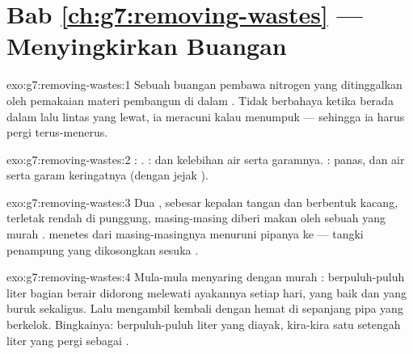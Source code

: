 \section*{Bab \ref{ch:g7:removing-wastes} --- Menyingkirkan Buangan}

\begin{solution}{exo:g7:removing-wastes:1}
Sebuah buangan pembawa nitrogen yang ditinggalkan oleh pemakaian  materi pembangun di dalam . Tidak berbahaya ketika berada
dalam lalu lintas yang lewat, ia meracuni kalau menumpuk --- sehingga
ia harus pergi terus-menerus.
\end{solution}

\begin{solution}{exo:g7:removing-wastes:2}
: . :  dan kelebihan air serta
garamnya. : panas, dan air serta garam keringatnya (dengan jejak
).
\end{solution}

\begin{solution}{exo:g7:removing-wastes:3}
Dua , sebesar kepalan tangan dan berbentuk kacang, terletak rendah
di punggung, masing-masing diberi makan oleh sebuah  yang murah
.  menetes dari masing-masingnya menuruni pipanya ke  --- tangki penampung yang dikosongkan sesuka .
\end{solution}

\begin{solution}{exo:g7:removing-wastes:4}
Mula-mula menyaring dengan murah : berpuluh-puluh liter bagian
berair  didorong melewati ayakannya setiap hari, yang baik dan
yang buruk sekaligus. Lalu mengambil kembali dengan hemat di sepanjang
pipa yang berkelok. Bingkainya: berpuluh-puluh liter yang diayak,
kira-kira satu setengah liter yang pergi sebagai .
\end{solution}

